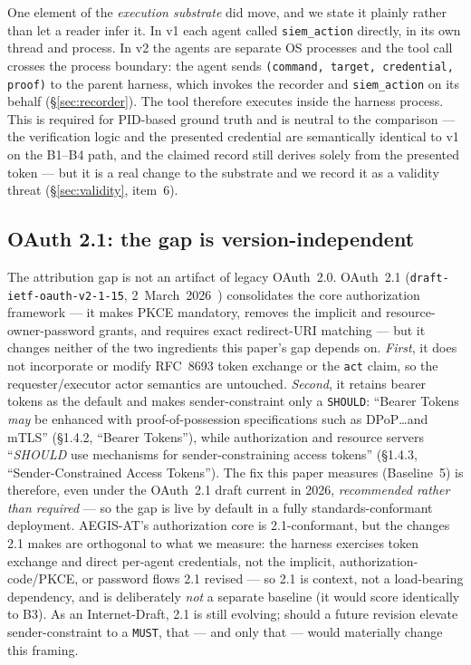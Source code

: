 \documentclass[11pt]{article}
\newcommand{\code}[1]{\texttt{#1}}
\newcommand{\siem}{\code{siem\_action}}
\begin{document}
One element of the \emph{execution substrate} did move, and we state it plainly
rather than let a reader infer it. In v1 each agent called \siem{} directly,
in its own thread and process. In v2 the agents are separate OS processes and
the tool call crosses the process boundary: the agent sends
\code{(command, target, credential, proof)} to the parent harness, which
invokes the recorder and \siem{} on its behalf (\S\ref{sec:recorder}). The tool
therefore executes inside the harness process. This is required for PID-based
ground truth and is neutral to the comparison --- the verification logic and
the presented credential are semantically identical to v1 on the B1--B4 path, and the claimed record still
derives solely from the presented token --- but it is a real change to the
substrate and we record it as a validity threat (\S\ref{sec:validity},
item~6).

\subsection{OAuth 2.1: the gap is version-independent}
The attribution gap is not an artifact of legacy OAuth~2.0. OAuth~2.1
(\code{draft-ietf-oauth-v2-1-15}, 2~March~2026~\cite{oauth21}) consolidates the
core authorization framework --- it makes PKCE mandatory, removes the implicit
and resource-owner-password grants, and requires exact redirect-URI matching ---
but it changes neither of the two ingredients this paper's gap depends on.
\emph{First}, it does not incorporate or modify RFC~8693 token exchange or the
\code{act} claim, so the requester/executor actor semantics are untouched.
\emph{Second}, it retains bearer tokens as the default and makes
sender-constraint only a \code{SHOULD}: ``Bearer Tokens \emph{may} be enhanced
with proof-of-possession specifications such as DPoP\ldots and mTLS''
(\S1.4.2, ``Bearer Tokens''), while authorization and resource servers
``\emph{SHOULD} use mechanisms for sender-constraining access tokens''
(\S1.4.3, ``Sender-Constrained Access Tokens''). The fix this paper measures
(Baseline~5) is therefore, even under the OAuth~2.1 draft current in 2026,
\emph{recommended rather than required} --- so the gap is live by default in a
fully standards-conformant deployment. AEGIS-AT's authorization core is
2.1-conformant, but the changes 2.1 makes are orthogonal to what we measure: the
harness exercises token exchange and direct per-agent credentials, not the
implicit, authorization-code/PKCE, or password flows 2.1 revised --- so 2.1 is
context, not a load-bearing dependency, and is deliberately \emph{not} a separate
baseline (it would score identically to B3). As an Internet-Draft, 2.1 is still
evolving; should a future revision elevate sender-constraint to a \code{MUST},
that --- and only that --- would materially change this framing.
\end{document}
